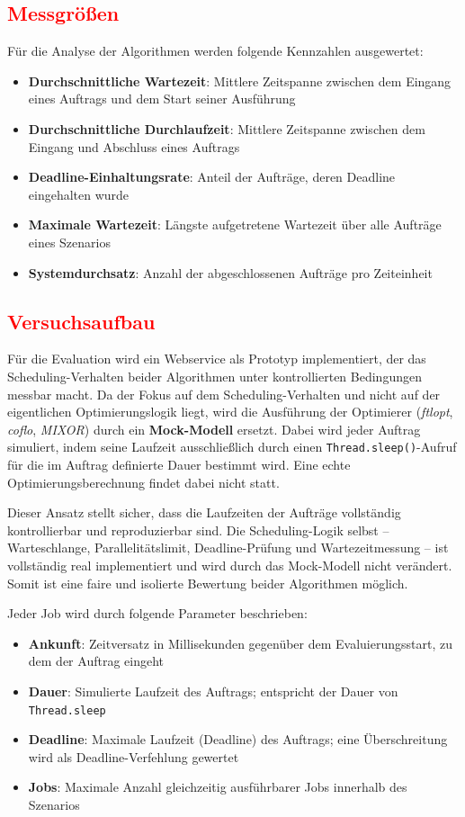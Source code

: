 \documentclass[
    12pt,               
    a4paper,            
    ngerman,            
    parskip=half,       
    headings=normal,   
    numbers=enddot,     
    toc=chapterentrywithdots 
]{scrreprt}\usepackage[utf8]{inputenc}
\begin{document}
\subsection{\textcolor{red}{Messgrößen}}
Für die Analyse der Algorithmen werden folgende Kennzahlen ausgewertet:
\begin{itemize}
    \item \textbf{Durchschnittliche Wartezeit}: Mittlere Zeitspanne zwischen dem Eingang eines Auftrags und dem Start seiner Ausführung
    \item \textbf{Durchschnittliche Durchlaufzeit}: Mittlere Zeitspanne zwischen dem Eingang und Abschluss eines Auftrags
    \item \textbf{Deadline-Einhaltungsrate}: Anteil der Aufträge, deren Deadline eingehalten wurde
    \item \textbf{Maximale Wartezeit}: Längste aufgetretene Wartezeit über alle Aufträge eines Szenarios
    \item \textbf{Systemdurchsatz}: Anzahl der abgeschlossenen Aufträge pro Zeiteinheit
\end{itemize}

\subsection{\textcolor{red}{Versuchsaufbau}}

Für die Evaluation wird ein Webservice als Prototyp implementiert, der das Scheduling-Verhalten beider Algorithmen unter kontrollierten Bedingungen messbar macht. Da der Fokus auf dem Scheduling-Verhalten und nicht auf der eigentlichen Optimierungslogik liegt, wird die Ausführung der Optimierer (\textit{ftlopt}, \textit{coflo}, \textit{MIXOR}) durch ein \textbf{Mock-Modell} ersetzt. Dabei wird jeder Auftrag simuliert, indem seine Laufzeit ausschließlich durch einen \texttt{Thread.sleep()}-Aufruf für die im Auftrag definierte Dauer bestimmt wird. Eine echte Optimierungsberechnung findet dabei nicht statt.

Dieser Ansatz stellt sicher, dass die Laufzeiten der Aufträge vollständig kontrollierbar und reproduzierbar sind. Die Scheduling-Logik selbst -- Warteschlange, Parallelitätslimit, Deadline-Prüfung und Wartezeitmessung -- ist vollständig real implementiert und wird durch das Mock-Modell nicht verändert. Somit ist eine faire und isolierte Bewertung beider Algorithmen möglich.

Jeder Job wird durch folgende Parameter beschrieben:
\begin{itemize}
    \item \textbf{Ankunft}: Zeitversatz in Millisekunden gegenüber dem Evaluierungsstart, zu dem der Auftrag eingeht
    \item \textbf{Dauer}: Simulierte Laufzeit des Auftrags; entspricht der Dauer von \texttt{Thread.sleep}
    \item \textbf{Deadline}: Maximale Laufzeit (Deadline) des Auftrags; eine Überschreitung wird als Deadline-Verfehlung gewertet
    \item \textbf{Jobs}: Maximale Anzahl gleichzeitig ausführbarer Jobs innerhalb des Szenarios
\end{itemize}
\end{document}
